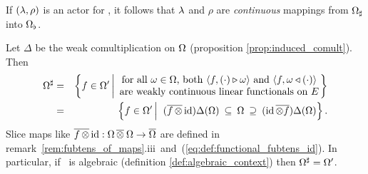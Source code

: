 \begin{remarks}  \label{rem:three_topologies}
\item
   If $(\lambda,\rho)$ is an actor for \EE, it follows that $\lambda$ and $\rho$ are
   {\em continuous\/} mappings from $\Omega_\sharp$ into $\Omega_\flat$.
 \item
   Let $\Delta$ be the weak comultiplication on $\Omega$
   (proposition \ref{prop:induced_comult}). Then
   \begin{eqnarray*}
     \Om\adl &=& \left \{ f \in \Om' \left|
          \begin{array}{c}
            \mbox{for all $\om\in \Om$, both $\pair{f}{(\cdot) \lact \om}$
                  and $\pair{f}{\om \ract (\cdot)}$}   \\
            \mbox{are weakly continuous linear functionals on $E$}
          \end{array} \right. \!\!\! \right\}  \\
        &=& \left\{ f \in \Om'  \left|\vertL\right.\;
          (\overline{f\, \tens}\,\id)\Delta(\Om) \:\subseteq \: \Om \:\supseteq \:
          (\id\, \overline{\tens f})\Delta(\Om) \right\}.
   \end{eqnarray*}
   Slice maps like $\overline{f\, \otimes}\, \mbox{\rm id}: \Omega \,\overline{\otimes}\: \Omega \rightarrow \overline{\Omega}$
   are defined in
   \mbox{remark \ref{rem:fubtens_of_maps}.iii and (\ref{eq:def:functional_fubtens_id})}\@.
   In particular, if \EE\ is algebraic (definition \ref{def:algebraic_context})
   then $\Omega^\sharp=\Omega'$.
\end{remarks}



